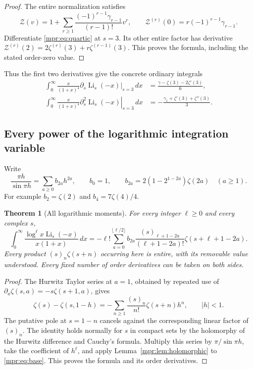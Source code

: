 \documentclass[11pt,letterpaper]{article}
\numberwithin{equation}{section}
\newtheorem{theorem}{Theorem}[section]
\theoremstyle{definition}
\theoremstyle{remark}
\begin{document}
\begin{proof}
The entire normalization satisfies
\[
 \mathscr Z(v)=1+\sum_{r\ge1}
                 \frac{(-1)^{r-1}\gamma_{r-1}}{(r-1)!}v^r,
 \qquad
 \mathscr Z^{(r)}(0)=r(-1)^{r-1}\gamma_{r-1}.
\]
Differentiate \eqref{mpr:eq:quartic} at $s=3$.  Its other entire factor
has derivative
$\mathscr Z^{(r)}(2)=2\zeta^{(r)}(3)+r\zeta^{(r-1)}(3)$.
This proves the formula, including the stated order-zero value.
\end{proof}

Thus the first two derivatives give the concrete ordinary integrals
\begin{align*}
 \int_0^\infty\frac{x}{(1+x)^4}
    \left.\partial_s\operatorname{Li}_s(-x)\right|_{s=3}\,dx
   &=\frac{\gamma-\zeta(3)-2\zeta'(3)}6,\\
 \int_0^\infty\frac{x}{(1+x)^4}
    \left.\partial_s^2\operatorname{Li}_s(-x)\right|_{s=3}\,dx
   &=-\frac{\gamma_1+\zeta'(3)+\zeta''(3)}3.
\end{align*}

\subsection{Every power of the logarithmic integration variable}

Write
\[
 \frac{\pi h}{\sin\pi h}=\sum_{a\ge0}b_{2a}h^{2a},\qquad
 b_0=1,\qquad b_{2a}=2(1-2^{1-2a})\zeta(2a)\quad(a\ge1).
\]
For example $b_2=\zeta(2)$ and $b_4=7\zeta(4)/4$.

\begin{theorem}[All logarithmic moments]\label{mpr:thm:logmoments}
For every integer $\ell\ge0$ and every complex $s$,
\begin{equation}\label{mpr:eq:logmoments}
 \boxed{\displaystyle
 \int_0^\infty
       \frac{\log^\ell x\operatorname{Li}_s(-x)}{x(1+x)}\,dx
 =-\ell!\sum_{a=0}^{\lfloor\ell/2\rfloor}
        b_{2a}\frac{(s)_{\ell+1-2a}}{(\ell+1-2a)!}
                    \zeta(s+\ell+1-2a).}
\end{equation}
Every product $(s)_n\zeta(s+n)$ occurring here is entire, with its
removable value understood.  Every fixed number of order derivatives
can be taken on both sides.
\end{theorem}

\begin{proof}
The Hurwitz Taylor series at $a=1$, obtained by repeated use of
$\partial_a\zeta(s,a)=-s\zeta(s+1,a)$, gives
\[
 \zeta(s)-\zeta(s,1-h)
    =-\sum_{n\ge1}\frac{(s)_n}{n!}\zeta(s+n)h^n,
       \qquad |h|<1.
\]
The putative pole at $s=1-n$ cancels against the corresponding linear
factor of $(s)_n$.  The identity holds normally for $s$ in compact sets
by the holomorphy of the Hurwitz difference and Cauchy's formula.
Multiply this series by $\pi/\sin\pi h$, take the coefficient of
$h^\ell$, and apply Lemma~\ref{mpr:lem:holomorphic} to
\eqref{mpr:eq:base}.  This proves the formula and its order derivatives.
\end{proof}
\end{document}
